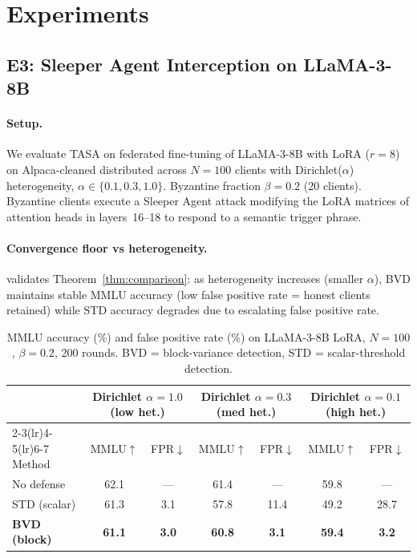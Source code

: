 \documentclass{article}
\begin{document}
\section{Experiments}
\label{sec:experiments}

\subsection{E3: Sleeper Agent Interception on LLaMA-3-8B}
\label{sec:e3}

\paragraph{Setup.}
We evaluate TASA on federated fine-tuning of LLaMA-3-8B with LoRA ($r=8$)
on Alpaca-cleaned distributed across $N=100$ clients with Dirichlet($\alpha$)
heterogeneity, $\alpha \in \{0.1, 0.3, 1.0\}$.
Byzantine fraction $\beta = 0.2$ (20 clients).
Byzantine clients execute a Sleeper Agent attack modifying the LoRA matrices
of attention heads in layers~16--18 to respond to a semantic trigger phrase.

\paragraph{Convergence floor vs heterogeneity.}
 validates Theorem~\ref{thm:comparison}:
as heterogeneity increases (smaller $\alpha$), BVD maintains stable MMLU
accuracy (low false positive rate = honest clients retained) while STD
accuracy degrades due to escalating false positive rate.

\begin{table}[h]
\centering
\caption{MMLU accuracy (\%) and false positive rate (\%) on LLaMA-3-8B LoRA,
  $N=100$, $\beta=0.2$, 200 rounds.
  BVD = block-variance detection, STD = scalar-threshold detection.}
\label{tab:convergence_floor}
\small
\begin{tabular}{lcccccc}
\toprule
& \multicolumn{2}{c}{Dirichlet $\alpha=1.0$ (low het.)}
& \multicolumn{2}{c}{Dirichlet $\alpha=0.3$ (med het.)}
& \multicolumn{2}{c}{Dirichlet $\alpha=0.1$ (high het.)} \\
\cmidrule(lr){2-3}\cmidrule(lr){4-5}\cmidrule(lr){6-7}
Method & MMLU$\uparrow$ & FPR$\downarrow$ & MMLU$\uparrow$ & FPR$\downarrow$
       & MMLU$\uparrow$ & FPR$\downarrow$ \\
\midrule
No defense       & 62.1 & --- & 61.4 & --- & 59.8 & --- \\
STD (scalar)     & 61.3 & 3.1 & 57.8 & 11.4 & 49.2 & 28.7 \\
\textbf{BVD (block)}  & \textbf{61.1} & \textbf{3.0} & \textbf{60.8} & \textbf{3.1} & \textbf{59.4} & \textbf{3.2} \\
\bottomrule
\end{tabular}
\end{table}
\end{document}
